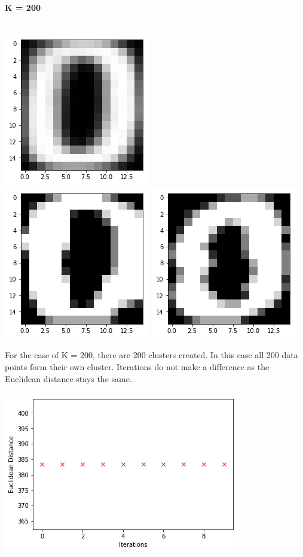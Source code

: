\documentclass[a4paper]{article}
\begin{document}
{\begin{center}
\end{center} 
}
\newpage
\textbf{\large K = 200} \\ \\
\begin{center}
\includegraphics[scale=.85]{./k4_11.png}  \\
\includegraphics[scale=.85]{./k4_3.png}  
\includegraphics[scale=.85]{./k4_1.png}  \\
\end{center}
For the case of K = 200, there are 200 clusters created. In this case all 200 data points form their own cluster. Iterations do not make a difference as the Euclidean distance stays the same. \\
\begin{center}
 \includegraphics[scale=.80]{./k4plt.png} \\
\end{center} 
\end{document}
